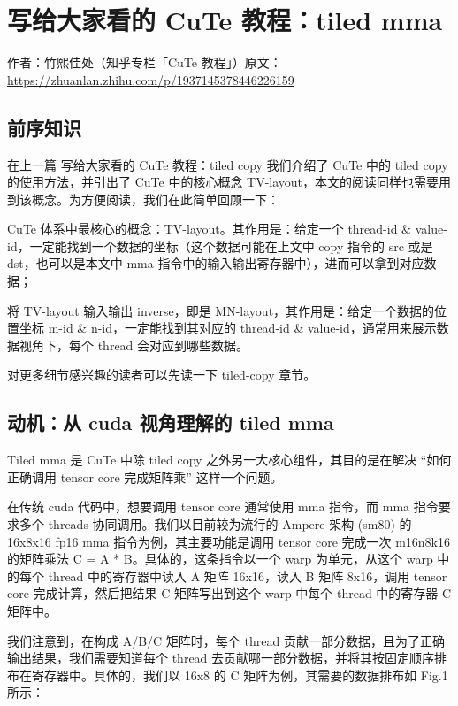 \chapter{写给大家看的 CuTe 教程：tiled mma}

\begin{center}\small 作者：竹熙佳处（知乎专栏「CuTe 教程」）\quad 原文：\url{https://zhuanlan.zhihu.com/p/1937145378446226159}\end{center}

\section{前序知识}

在上一篇 写给大家看的 CuTe 教程：tiled copy 我们介绍了 CuTe 中的 tiled copy 的使用方法，并引出了 CuTe 中的核心概念 TV-layout，本文的阅读同样也需要用到该概念。为方便阅读，我们在此简单回顾一下：

CuTe 体系中最核心的概念：TV-layout。其作用是：给定一个 thread-id \& value-id，一定能找到一个数据的坐标（这个数据可能在上文中 copy 指令的 src 或是 dst，也可以是本文中 mma 指令中的输入输出寄存器中），进而可以拿到对应数据；

将 TV-layout 输入输出 inverse，即是 MN-layout，其作用是：给定一个数据的位置坐标 m-id \& n-id，一定能找到其对应的 thread-id \& value-id，通常用来展示数据视角下，每个 thread 会对应到哪些数据。

对更多细节感兴趣的读者可以先读一下 tiled-copy 章节。

\section{动机：从 cuda 视角理解的 tiled mma}

Tiled mma 是 CuTe 中除 tiled copy 之外另一大核心组件，其目的是在解决 “如何正确调用 tensor core 完成矩阵乘” 这样一个问题。

在传统 cuda 代码中，想要调用 tensor core 通常使用 mma 指令，而 mma 指令要求多个 threads 协同调用。我们以目前较为流行的 Ampere 架构 (sm80) 的 16x8x16 fp16 mma 指令为例，其主要功能是调用 tensor core 完成一次 m16n8k16 的矩阵乘法 C = A * B。具体的，这条指令以一个 warp 为单元，从这个 warp 中的每个 thread 中的寄存器中读入 A 矩阵 16x16，读入 B 矩阵 8x16，调用 tensor core 完成计算，然后把结果 C 矩阵写出到这个 warp 中每个 thread 中的寄存器 C 矩阵中。

我们注意到，在构成 A/B/C 矩阵时，每个 thread 贡献一部分数据，且为了正确输出结果，我们需要知道每个 thread 去贡献哪一部分数据，并将其按固定顺序排布在寄存器中。具体的，我们以 16x8 的 C 矩阵为例，其需要的数据排布如 Fig.1 所示：

